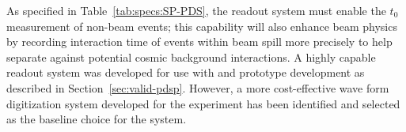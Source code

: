 As specified in Table~\ref{tab:specs:SP-PDS}, the readout system must enable the $t_0$ measurement of non-beam events; this capability will also enhance beam physics by recording interaction time of events within 
beam spill more precisely to help separate against potential cosmic background interactions. A highly capable readout system was developed for use with  and prototype development 
as described in Section~\ref{sec:valid-pdsp}. However, a more cost-effective wave form digitization system developed for the  experiment has been identified and selected as the baseline choice for the  system. %






